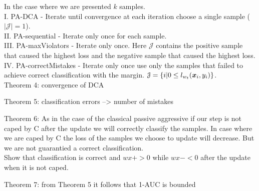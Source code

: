 In the case where we are presented $k$ samples. \\
I. PA-DCA - Iterate until convergence at each iteration choose a single sample ($|\mathcal{J}|=1$).\\
II. PA-sequential - Iterate only once for each sample.\\
III. PA-maxViolators - Iterate only once. Here $\mathcal{J}$ contains the positive sample that caused the highest loss and the negative sample that caused the highest loss. \\
IV. PA-correctMistakes - Iterate only once use only the samples that failed to achieve correct classification with the margin. $\mathcal{J} = \{ i | 0 \leq l_{w_t}(\bm{x}_i, y_i) \}$.\\


Theorem 4: convergence of DCA

Theorem 5: classification errors --> number of mistakes

Theorem 6: As in the case of the classical passive aggressive if our step is not caped by C after the update we will correctly classify the samples. In case where we are caped by C the loss of the samples we choose to update will decrease. But we are not guarantied a correct classification. \\
Show that classification is correct and $ w x+ >0$ while $w x- < 0$ after the update when it is not caped.

Theorem 7: from Theorem 5 it follows that 1-AUC is bounded
